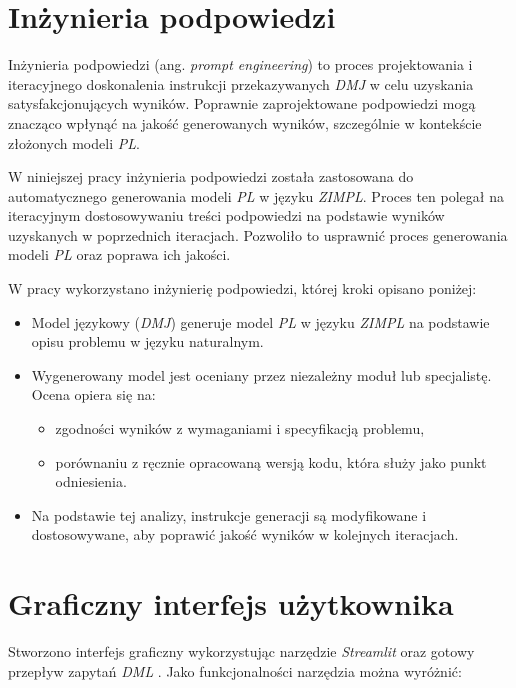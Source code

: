 \section{Inżynieria podpowiedzi}
Inżynieria podpowiedzi (ang. \textit{prompt engineering}) to proces projektowania i iteracyjnego doskonalenia instrukcji przekazywanych \textit{DMJ} w celu uzyskania satysfakcjonujących wyników. Poprawnie zaprojektowane podpowiedzi mogą znacząco wpłynąć na jakość generowanych wyników, szczególnie w kontekście złożonych modeli \textit{PL}.

W niniejszej pracy inżynieria podpowiedzi została zastosowana do automatycznego generowania modeli \textit{PL} w języku \textit{ZIMPL}. Proces ten polegał na iteracyjnym dostosowywaniu treści podpowiedzi na podstawie wyników uzyskanych w poprzednich iteracjach. Pozwoliło to usprawnić proces generowania modeli \textit{PL} oraz poprawa ich jakości.

W pracy wykorzystano inżynierię podpowiedzi, której kroki opisano poniżej:
\begin{itemize} 
\item Model językowy (\textit{DMJ}) generuje model \textit{PL} w języku \textit{ZIMPL} na podstawie opisu problemu w języku naturalnym. 
\item Wygenerowany model jest oceniany przez niezależny moduł lub specjalistę. Ocena opiera się na: 
    \begin{itemize} 
        \item zgodności wyników z wymaganiami i specyfikacją problemu, 
        \item porównaniu z ręcznie opracowaną wersją kodu, która służy jako punkt odniesienia. 
    \end{itemize} 
\item Na podstawie tej analizy, instrukcje generacji są modyfikowane i dostosowywane, aby poprawić jakość wyników w kolejnych iteracjach.\end{itemize}


\section{Graficzny interfejs użytkownika}\label{sec:generation:gui}

Stworzono interfejs graficzny wykorzystując narzędzie \textit{Streamlit} \cite{Streamlit2019} oraz gotowy przepływ zapytań \textit{DML} \cite{TODO}. Jako funkcjonalności narzędzia można wyróżnić:

